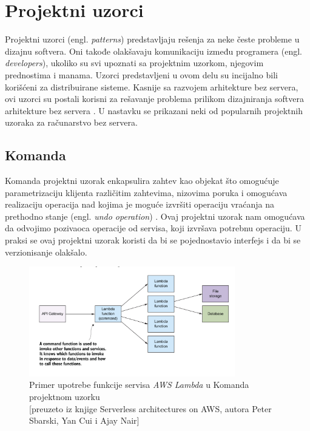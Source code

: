 \documentclass[12pt,oneside]{memoir}
\begin{document}
\section{Projektni uzorci}

Projektni uzorci (engl. \emph{patterns}) predstavljaju rešenja za neke česte probleme u dizajnu softvera. Oni takođe olakšavaju komunikaciju između programera (engl. \emph{developers}), ukoliko su svi upoznati sa projektnim uzorkom, njegovim prednostima i manama. Uzorci predstavljeni u ovom delu su incijalno bili korišćeni za distribuirane sisteme. Kasnije sa razvojem arhitekture bez servera, ovi uzorci su postali korisni za rešavanje problema prilikom dizajniranja softvera arhitekture bez servera \cite{sa}. U nastavku se prikazani neki od popularnih projektnih uzoraka za računarstvo bez servera.


\subsection{Komanda}
Komanda projektni uzorak enkapsulira zahtev kao objekat što omogućuje parametrizaciju klijenta različitim zahtevima, nizovima poruka i omogućava realizaciju operacija nad kojima je moguće izvršiti operaciju vraćanja na prethodno stanje (engl. \emph{undo operation}) \cite{cdp}. Ovaj projektni uzorak nam omogućava da odvojimo pozivaoca operacije od servisa, koji izvršava potrebnu operaciju. U praksi se ovaj projektni uzorak koristi da bi se pojednostavio interfejs i da bi se verzionisanje olakšalo.

\begin{figure}[!ht]
  \centering
  \includegraphics[width=0.8\textwidth]{Slika 12.png}
  \caption{Primer upotrebe funkcije servisa \emph{AWS Lambda} u Komanda projektnom uzorku\\\footnotesize[preuzeto iz knjige Serverless architectures on AWS, autora Peter Sbarski, Yan Cui i Ajay Nair]}
  \label{fig:komanda}
\end{figure}
\end{document}
